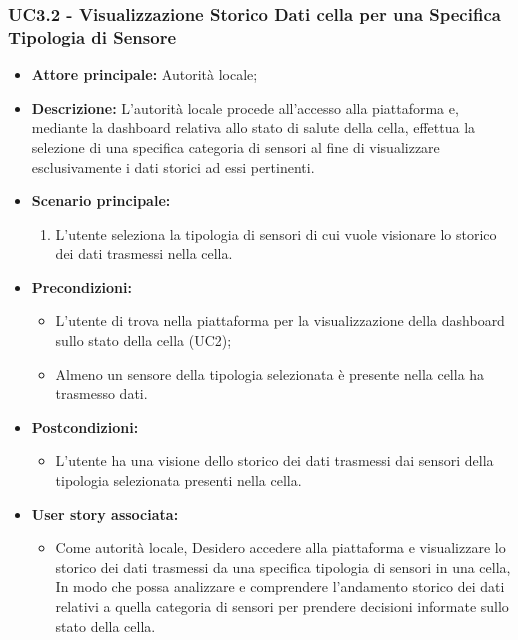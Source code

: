 \documentclass{article}
\begin{document}
\subsubsection{UC3.2 - Visualizzazione Storico Dati cella per una Specifica Tipologia di Sensore}
\begin{itemize}
    \item \textbf{Attore principale:} Autorità locale;
    \item \textbf{Descrizione:} L’autorità locale procede all’accesso alla piattaforma e, mediante la
          dashboard relativa allo stato di salute della cella, effettua la selezione di una specifica
          categoria di sensori al fine di visualizzare esclusivamente i dati storici ad essi pertinenti.
    \item \textbf{Scenario principale:}
          \begin{enumerate}
              \item L'utente seleziona la tipologia di sensori di cui vuole visionare lo storico dei dati trasmessi nella cella.
          \end{enumerate}
    \item \textbf{Precondizioni:}
          \begin{itemize}
              \item L'utente di trova nella piattaforma per la visualizzazione della dashboard sullo stato della cella (UC2);
              \item  Almeno un sensore della tipologia selezionata è presente nella cella ha trasmesso dati.
          \end{itemize}
    \item \textbf{Postcondizioni:}
          \begin{itemize}
              \item  L'utente ha una visione dello storico dei dati trasmessi dai sensori della tipologia selezionata presenti nella cella.
          \end{itemize}
    \item \textbf{User story associata:}
          \begin{itemize}
              \item Come autorità locale,
                    Desidero accedere alla piattaforma e visualizzare lo storico dei dati trasmessi da una specifica tipologia di sensori in una cella,
                    In modo che possa analizzare e comprendere l'andamento storico dei dati relativi a quella categoria di sensori per prendere decisioni informate sullo stato della cella.
          \end{itemize}
\end{itemize}
\end{document}
